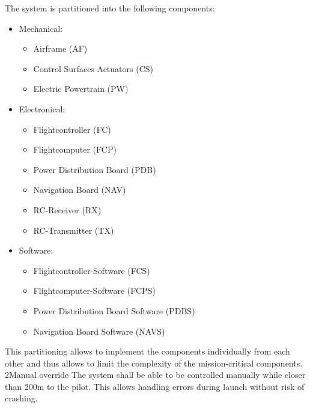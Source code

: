     {
        The system is partitioned into the following components:
        \begin{itemize}
            \item Mechanical:
                \begin{itemize}
                    \item Airframe (AF)
                    \item Control Surfaces Actuators (CS) 
                    \item Electric Powertrain (PW)
                \end{itemize}
            \item Electronical:
                \begin{itemize}
                    \item Flightcontroller (FC)
                    \item Flightcomputer (FCP)
                    \item Power Distribution Board (PDB)
                    \item Navigation Board (NAV)
                    \item RC-Receiver (RX)
                    \item RC-Transmitter (TX)
                \end{itemize}
            \item Software:
                \begin{itemize}
                    \item Flightcontroller-Software (FCS)
                    \item Flightcomputer-Software (FCPS)
                    \item Power Distribution Board Software (PDBS)
                    \item Navigation Board Software (NAVS)
                \end{itemize}
        \end{itemize}
    }
    {
        This partitioning allows to implement the components
        individually from each other and thus allows to limit the complexity
        of the mission-critical components.
    }
\dd
    {2}{Manual override}
    {
        The system shall be able to be controlled manually
        while closer than 200m to the pilot.
    }
    {
        This allows handling errors during launch without
        risk of crashing.
    }

